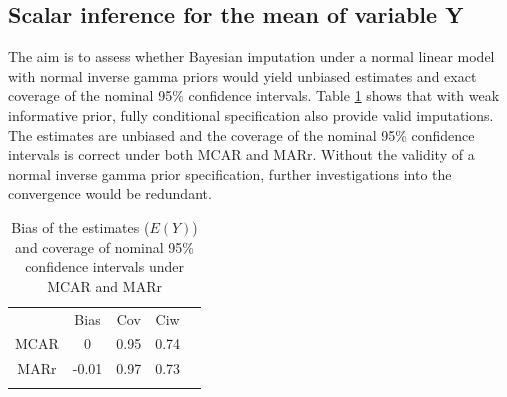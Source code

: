 \documentclass[12pt, fullpage, a4paper]{article}
\begin{document}
\subsection{Scalar inference for the mean of variable Y}
The aim is to assess whether Bayesian imputation under a normal linear model with normal inverse gamma priors would yield unbiased estimates and exact coverage of the nominal 95\% confidence intervals. Table \ref{tab1} shows that with weak informative prior, fully conditional specification also provide valid imputations. The estimates are unbiased and the coverage of the nominal 95\% confidence intervals is correct under both MCAR and MARr. Without the validity of a normal inverse gamma prior specification, further investigations into the convergence would be redundant. 
\begin{table}[h]
	\centering
	\begin{tabular}{ccccc}
		& Bias  & Cov  & Ciw &  \\
		MCAR & 0     & 0.95 & 0.74 &  \\
		MARr & -0.01 & 0.97 & 0.73 &  \\
		&       &      &  & 
	\end{tabular}
\caption{Bias of the estimates ($E(Y)$) and coverage of nominal 95\% confidence intervals under MCAR and MARr}
\label{tab1}
\end{table}
\end{document}
